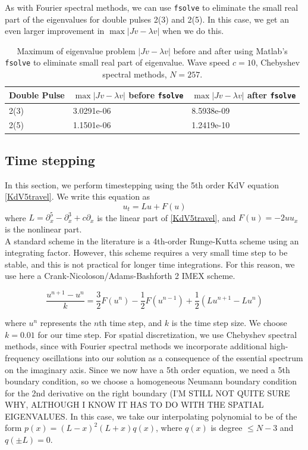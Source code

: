 \documentclass[12pt]{article}
\begin{document}
As with Fourier spectral methods, we can use \texttt{fsolve} to eliminate the small real part of the eigenvalues for double pulses 2(3) and 2(5). In this case, we get an even larger improvement in $\max{|Jv - \lambda v|}$ when we do this.

\begin{table}[H]
\begin{tabular}{l|ll}
 Double Pulse   & $\max{|Jv - \lambda v|}$ before \texttt{fsolve} & $\max{|Jv - \lambda v|}$ after \texttt{fsolve}\\ \hline
  2(3) & 3.0291e-06 & 8.5938e-09 \\
  2(5) & 1.1501e-06 & 1.2419e-10 \\
\end{tabular}
\caption{Maximum of eigenvalue problem $|Jv - \lambda v|$ before and after using Matlab's \texttt{fsolve} to eliminate small real part of eigenvalue. Wave speed $c = 10$, Chebyshev spectral methods, $N = 257$.}
\end{table}

\subsection{Time stepping}

In this section, we perform timestepping using the 5th order KdV equation \eqref{KdV5travel}. We write this equation as 
\begin{equation} \label{KdV5separated}
u_t = Lu + F(u)
\end{equation}
where $L = \partial_x^5 - \partial_x^3 + c \partial_x$ is the linear part of \eqref{KdV5travel}, and $F(u) = -2 u u_x$ is the nonlinear part.\\

A standard scheme in the literature is a 4th-order Runge-Kutta scheme using an integrating factor. However, this scheme requires a very small time step to be stable, and this is not practical for longer time integrations. For this reason, we use here a  Crank-Nicoloson/Adams-Bashforth 2 IMEX scheme.

\begin{equation}\label{scheme}
\frac{u^{n+1} - u^n}{k} = \frac{3}{2}F(u^n) - \frac{1}{2}F(u^{n-1}) + \frac{1}{2}\left(Lu^{n+1} - Lu^n \right) 
\end{equation}

where $u^n$ represents the $n$th time step, and $k$ is the time step size. We choose $k = 0.01$ for our time step. For spatial discretization, we use Chebyshev spectral methods, since with Fourier spectral methods we incorporate additional high-frequency oscillations into our solution as a consequence of the essential spectrum on the imaginary axis. Since we now have a 5th order equation, we need a 5th boundary condition, so we choose a homogeneous Neumann boundary condition for the 2nd derivative on the right boundary (I'M STILL NOT QUITE SURE WHY, ALTHOUGH I KNOW IT HAS TO DO WITH THE SPATIAL EIGENVALUES. In this case, we take our interpolating polynomial to be of the form $p(x) = (L-x)^2 (L+x) q(x)$, where $q(x)$ is degree $\leq N-3$ and $q(\pm L) = 0$. \\
\end{document}
